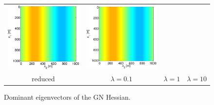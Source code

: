 \documentclass{iopart}
\begin{document}
\begin{figure}
\begin{tabular}{cccc}
\includegraphics[scale=.2]{./figs/2D_exp0_g}&
\includegraphics[scale=.2]{./figs/2D_exp0_h}\\
{\small reduced}&{\small $\lambda=0.1$}&{\small $\lambda=1$}&{\small $\lambda=10$}\\
\end{tabular}
\caption{Dominant eigenvectors of the GN Hessian.}
\label{fig:2D_exp0a}
\end{figure}
\end{document}
